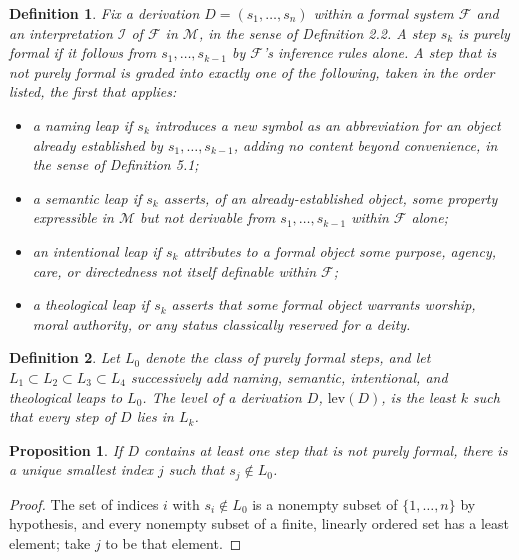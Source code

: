 \documentclass[11pt]{book}
\newtheorem*{appendixdefinition}{Definition}
\newtheorem*{appendixproposition}{Proposition}
\begin{document}
\begin{appendixdefinition}
Fix a derivation $D = (s_1, \dots, s_n)$ within a formal system $\mathcal F$ and an interpretation $\mathcal I$ of $\mathcal F$ in $\mathcal M$, in the sense of Definition 2.2. A step $s_k$ is \emph{purely formal} if it follows from $s_1, \dots, s_{k-1}$ by $\mathcal F$'s inference rules alone. A step that is not purely formal is graded into exactly one of the following, taken in the order listed, the first that applies:
\begin{itemize}
\item a \emph{naming leap} if $s_k$ introduces a new symbol as an abbreviation for an object already established by $s_1, \dots, s_{k-1}$, adding no content beyond convenience, in the sense of Definition 5.1;
\item a \emph{semantic leap} if $s_k$ asserts, of an already-established object, some property expressible in $\mathcal M$ but not derivable from $s_1, \dots, s_{k-1}$ within $\mathcal F$ alone;
\item an \emph{intentional leap} if $s_k$ attributes to a formal object some purpose, agency, care, or directedness not itself definable within $\mathcal F$;
\item a \emph{theological leap} if $s_k$ asserts that some formal object warrants worship, moral authority, or any status classically reserved for a deity.
\end{itemize}
\end{appendixdefinition}

\begin{appendixdefinition}
Let $L_0$ denote the class of purely formal steps, and let $L_1 \subset L_2 \subset L_3 \subset L_4$ successively add naming, semantic, intentional, and theological leaps to $L_0$. The \emph{level} of a derivation $D$, $\mathrm{lev}(D)$, is the least $k$ such that every step of $D$ lies in $L_k$.
\end{appendixdefinition}

\begin{appendixproposition}
If $D$ contains at least one step that is not purely formal, there is a unique smallest index $j$ such that $s_j \notin L_0$.
\end{appendixproposition}

\begin{proof}
The set of indices $i$ with $s_i \notin L_0$ is a nonempty subset of $\{1, \dots, n\}$ by hypothesis, and every nonempty subset of a finite, linearly ordered set has a least element; take $j$ to be that element.
\end{proof}
\end{document}
